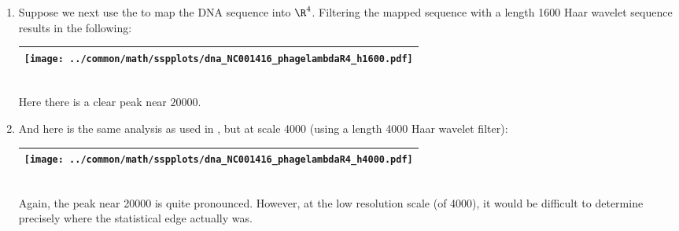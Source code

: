 \begin{example}
\begin{enumerate}
  \item \label{item:dnapl_R6}
    Suppose we next use the   to map
    the DNA sequence into $\R^4$.
    Filtering the mapped sequence with a length 1600 Haar wavelet sequence results in the following:
     \\\begin{tabular}{|>{\scs}c|}
          \hline
          \texttt{[image: ../common/math/sspplots/dna\_NC001416\_phagelambdaR4\_h1600.pdf]}%
        \\\hline
     \end{tabular}\\
     Here there is a clear peak near $20000$.

  \item And here is the same analysis as used in , but at scale 4000
        (using a length 4000 Haar wavelet filter):
     \\\begin{tabular}{|>{\scs}c|}
          \hline
          \texttt{[image: ../common/math/sspplots/dna\_NC001416\_phagelambdaR4\_h4000.pdf]}%
        \\\hline
     \end{tabular}\\
     Again, the peak near 20000 is quite pronounced.
     However, at the low resolution scale (of 4000), it would be difficult to determine precisely where the
     statistical edge actually was.
\end{enumerate}
\end{example}



